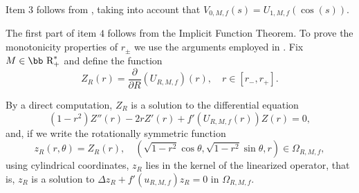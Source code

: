 \documentclass[11pt]{article}
\def\r{\hbox{\bb R}}
\numberwithin{equation} {section}
\begin{document}
Item 3 follows from \cite[Lemma 3.6]{EM}, taking into account that $V_{0,M,f} (s) = U_{1,M,f} (\cos (s))$.

The first part of item $4$ follows from the Implicit Function Theorem. To prove the monotonicity properties of $r _ \pm$ we use the arguments employed in \cite{EM}. Fix $M \in \r_+^*$ and define the function
\begin{equation}\label{functionHR}
	Z_R (r)= \frac{\partial }{\partial R} \left(U_{R,M,f}\right) (r), \quad r \in [r_-, r_+].
\end{equation}

By a direct computation, $Z_R$ is a solution to the differential equation
\begin{equation*}%
	(1-r^2)Z''(r)- 2 r Z' (r)+ f' (U_{R,M,f} (r)) Z (r)=0, 
\end{equation*}
and, if we write the rotationally symmetric function
\begin{equation*}%
	z_R (r, \theta )= Z_R (r), \quad  (\sqrt{1-r^2} \cos \theta , \sqrt{1-r^2} \sin \theta ,r) \in \Omega_{R,M,f},
\end{equation*}
using cylindrical coordinates, $z_R$ lies in the kernel of the linearized operator, that is, $z_R$ is a solution to $\Delta z_R + f' (u_{R,M,f}) z_R =0$ in $\Omega_{R,M,f}$. 
\end{document}
